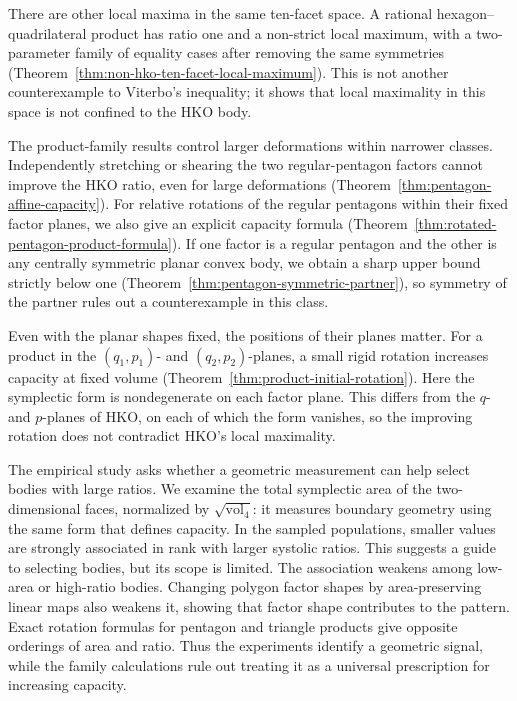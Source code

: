 There are other local maxima in the same ten-facet space. A rational
hexagon--quadrilateral product has ratio one and a non-strict local
maximum, with a two-parameter family of equality cases after removing the
same symmetries (Theorem~\ref{thm:non-hko-ten-facet-local-maximum}). This
is not another counterexample to Viterbo's inequality; it shows that local
maximality in this space is not confined to the HKO body.

The product-family results control larger deformations within narrower
classes. Independently stretching or shearing the two
regular-pentagon factors cannot improve the HKO ratio, even for large
deformations (Theorem~\ref{thm:pentagon-affine-capacity}). For relative
rotations of the regular pentagons within their fixed factor planes, we
also give an explicit capacity formula
(Theorem~\ref{thm:rotated-pentagon-product-formula}). If one factor is a
regular pentagon and the other is any centrally symmetric planar convex
body, we obtain a sharp upper bound strictly below one
(Theorem~\ref{thm:pentagon-symmetric-partner}), so symmetry of the partner
rules out a counterexample in this class.

Even with the planar shapes fixed, the positions of their planes matter.
For a product in the $(q_1,p_1)$- and $(q_2,p_2)$-planes, a small rigid
rotation increases capacity at fixed volume
(Theorem~\ref{thm:product-initial-rotation}). Here the symplectic form is
nondegenerate on each factor plane. This differs from the $q$- and
$p$-planes of HKO, on each of which the form vanishes, so the improving
rotation does not contradict HKO's local maximality.

The empirical study asks whether a geometric measurement can help select
bodies with large ratios. We examine the total symplectic area of the
two-dimensional faces, normalized by $\sqrt{\operatorname{vol}_4}$:
it measures boundary geometry using the same form that defines capacity.
In the sampled populations, smaller values are strongly associated in
rank with larger systolic ratios. This suggests a guide to selecting bodies,
but its scope is limited. The association weakens among low-area or
high-ratio bodies. Changing polygon factor shapes by area-preserving
linear maps also weakens it, showing that factor shape contributes to the
pattern. Exact rotation formulas for pentagon and triangle products give
opposite orderings of area and ratio. Thus the experiments identify a
geometric signal, while the family calculations rule out treating it as
a universal prescription for increasing capacity.

